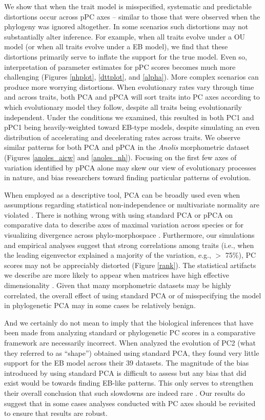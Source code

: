 \documentclass[a4paper,11pt]{article}
\begin{document}
We show that when the trait model is misspecified, systematic and predictable distortions occur across pPC axes -- similar to those that were observed when the phylogeny was ignored altogether. In some scenarios such distortions may not substantially alter inference. For example, when all traits evolve under a OU model (or when all traits evolve under a EB model), we find that these distortions primarily serve to inflate the support for the true model. Even so, interpretation of parameter estimates for pPC scores becomes much more challenging (Figures \ref{nhplot}, \ref{dttplot}, and \ref{alpha}). More complex scenarios can produce more worrying distortions. When evolutionary rates vary through time and across traits, both PCA and pPCA will sort traits into PC axes according to which evolutionary model they follow, despite all traits being evolutionarily independent. Under the conditions we examined, this resulted in both PC1 and pPC1 being heavily-weighted toward EB-type models, despite simulating an even distribution of accelerating and decelerating rates across traits. We observe similar patterns for both PCA and pPCA in the \textit{Anolis} morphometric dataset (Figures \ref{anoles_aicw} and \ref{anoles_nh}). Focusing on the first few axes of variation identified by pPCA alone may skew our view of evolutionary processes in nature, and bias researchers toward finding particular patterns of evolution. 

When employed as a descriptive tool, PCA can be broadly used even when assumptions regarding statistical non-independence or multivariate normality are violated \citep{Jolliffe2002}. There is nothing wrong with using standard PCA or pPCA on comparative data to describe axes of maximal variation across species or for visualizing divergence across phylo-morphospace \citep{Sidlauskas2008}. Furthermore, our simulations and empirical analyses suggest that strong correlations among traits (i.e., when the leading eigenvector explained a majority of the variation, e.g., $>$ 75\%), PC scores may not be appreciably distorted (Figure \ref{rank}). The statistical artifacts we describe are more likely to appear when matrices have high effective dimensionality \citep[see][]{Bookstein2012}. Given that many morphometric datasets may be highly correlated, the overall effect of using standard PCA or of misspecifying the model in phylogenetic PCA may in some cases be relatively benign. 

And we certainly do not mean to imply that the biological inferences that have been made from analyzing standard or phylogenetic PC scores in a comparative framework are necessarily incorrect. When \citet{Harmon2010} analyzed the evolution of PC2 (what they referred to as ``shape'') obtained using standard PCA, they found very little support for the EB model across their 39 datasets. The magnitude of the bias introduced by using standard PCA is difficult to assess but any bias that did exist would be towards finding EB-like patterns. This only serves to strengthen their overall conclusion that such slowdowns are indeed rare \citep[but see][]{SlaterPennell}. Our results do suggest that in some cases analyses conducted with PC axes should be revisited to ensure that results are robust.
\end{document}
